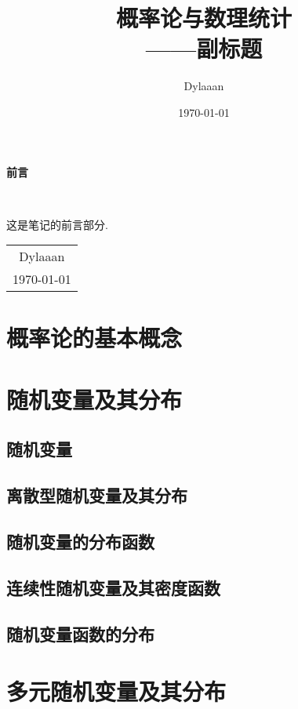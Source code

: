 \documentclass[12pt, a4paper, oneside]{ctexbook}
\title{{\Huge{\textbf{概率论与数理统计}}}\\——副标题}
\author{Dylaaan}
\date{\today}
\begin{document}
\maketitle

\setcounter{page}{1}

\begin{center}
    \Huge\textbf{前言}
\end{center}~\

这是笔记的前言部分. 
~\\
\begin{flushright}
    \begin{tabular}{c}
        Dylaaan\\
        \today
    \end{tabular}
\end{flushright}

\newpage
{}
\setcounter{page}{1}
\tableofcontents
\newpage
\setcounter{page}{1}
\chapter{概率论的基本概念}

\chapter{随机变量及其分布}
\section{随机变量}
\section{离散型随机变量及其分布}
\section{随机变量的分布函数}
\section{连续性随机变量及其密度函数}
\section{随机变量函数的分布}

\chapter{多元随机变量及其分布}
\end{document}
